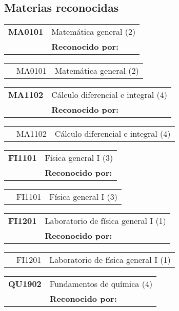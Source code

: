 \documentclass[letterpaper]{article}%
\begin{document}
\subsection*{Materias reconocidas}%
\label{subsec:Materiasreconocidas}%
\vspace*{0.5cm}%
\begin{tabularx}{\textwidth}{p{1.5cm}p{10cm}}%
\textbf{MA0101}&Matemática general (2)\\%
&\textbf{Reconocido por: }\\%
\end{tabularx}%
\begin{tabularx}{\textwidth}{p{1.5cm}p{1.5cm}p{10cm}}%
&MA0101&Matemática general (2)\\%
\end{tabularx}%
\begin{tabularx}{\textwidth}{p{1.5cm}p{10cm}}%
\textbf{MA1102}&Cálculo diferencial e integral (4)\\%
&\textbf{Reconocido por: }\\%
\end{tabularx}%
\begin{tabularx}{\textwidth}{p{1.5cm}p{1.5cm}p{10cm}}%
&MA1102&Cálculo diferencial e integral (4)\\%
\end{tabularx}%
\begin{tabularx}{\textwidth}{p{1.5cm}p{10cm}}%
\textbf{FI1101}&Física general I (3)\\%
&\textbf{Reconocido por: }\\%
\end{tabularx}%
\begin{tabularx}{\textwidth}{p{1.5cm}p{1.5cm}p{10cm}}%
&FI1101&Física general I (3)\\%
\end{tabularx}%
\begin{tabularx}{\textwidth}{p{1.5cm}p{10cm}}%
\textbf{FI1201}&Laboratorio de física general I (1)\\%
&\textbf{Reconocido por: }\\%
\end{tabularx}%
\begin{tabularx}{\textwidth}{p{1.5cm}p{1.5cm}p{10cm}}%
&FI1201&Laboratorio de física general I (1)\\%
\end{tabularx}%
\begin{tabularx}{\textwidth}{p{1.5cm}p{10cm}}%
\textbf{QU1902}&Fundamentos de química (4)\\%
&\textbf{Reconocido por: }\\%
\end{tabularx}%
\end{document}
